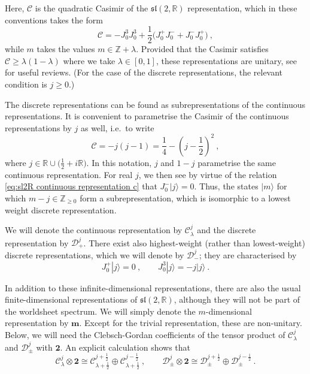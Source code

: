 \documentclass[12pt,a4paper]{article}
\newcommand{\be}{\begin{equation}}
\newcommand{\ee}{\end{equation}}
\newcommand{\ket}[1]{| #1\rangle}
\begin{document}
Here, $\mathcal{C}$ is the quadratic Casimir of the $\mathfrak{sl}(2,\mathds{R})$ representation, which in these conventions takes the form
\be 
\mathcal{C}=-J_0^3J_0^3+\frac{1}{2}\big(J_0^+J_0^-+J_0^-J_0^+\big)\ ,
\ee
while $m$ takes the values $m \in \mathds{Z}+\lambda$. Provided that the Casimir satisfies $\mathcal{C}\geq \lambda(1-\lambda)$ where we take $\lambda \in [0,1]$, these representations are unitary, see \cite{Sugiura,Kitaev:2017hnr} for useful reviews. (For the case of the discrete representations, the relevant condition is $j\geq 0$.)



The discrete representations can be found as subrepresentations of the continuous representations. It is convenient to parametrise the Casimir of the continuous representations by $j$ as well, i.e.\ to write 
\be 
\mathcal{C}=-j(j-1)=\frac{1}{4}-\left(j-\frac{1}{2}\right)^2\ , \label{eq:sl2 Casimir}
\ee
where $j \in \mathds{R} \cup \big(\tfrac{1}{2}+i \mathds{R}\big)$. In this notation, $j$ and $1-j$ parametrise the same continuous representation. For real $j$, we then see by virtue of the relation \eqref{eq:sl2R continuous representation c} that $J^-_0 \ket{j}=0$. Thus, the states $\ket{m}$ for which $m-j \in \mathds{Z}_{\ge 0}$ form a subrepresentation, which is isomorphic to a lowest weight discrete representation. 

We will denote the continuous representation by $\mathscr{C}^j_\lambda$ and the discrete representation by $\mathscr{D}^j_+$. There exist also highest-weight (rather than lowest-weight) discrete representations, which we will denote by $\mathscr{D}^j_-$; they are characterised by
\be 
J^+_0 \ket{j}=0\ , \qquad J^3_0 \ket{j}= - j \ket{j}\ .
\ee

In addition to these infinite-dimensional representations, there are also the usual finite-dimensional representations of $\mathfrak{sl}(2,\mathds{R})$, although they will not be part of the worldsheet spectrum. We will simply denote the $m$-dimensional representation by $\mathbf{m}$. Except for the trivial representation, these are non-unitary. Below, we will need the Clebsch-Gordan coefficients of the tensor product of $\mathscr{C}^j_\lambda$ and $\mathscr{D}^j_\pm$ with $\mathbf{2}$. An explicit calculation shows that 
\be 
\mathscr{C}^j_\lambda \otimes \mathbf{2} \cong \mathscr{C}^{j+\frac{1}{2}}_{\lambda+\frac{1}{2}} \oplus \mathscr{C}^{j-\frac{1}{2}}_{\lambda+\frac{1}{2}}\ , \qquad
\mathscr{D}^j_\pm \otimes \mathbf{2} \cong \mathscr{D}^{j+\frac{1}{2}}_\pm \oplus \mathscr{D}^{j-\frac{1}{2}}_\pm\ . \label{eq:sl2 Clebsch Gordan}
\ee
\smallskip
\end{document}
